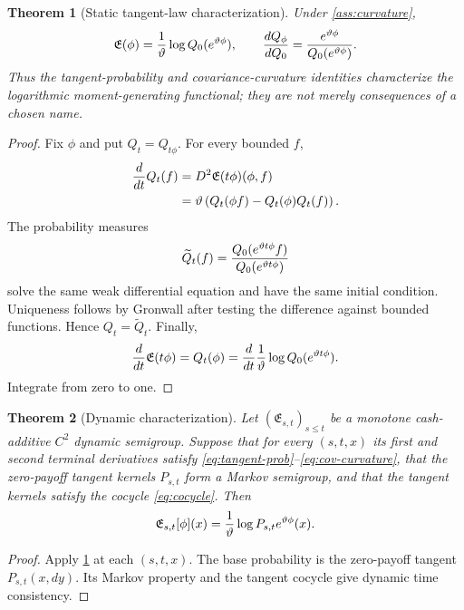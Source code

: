 \documentclass[11pt,reqno]{amsart}
\newtheorem{theorem}{Theorem}[section]
\theoremstyle{definition}
\theoremstyle{remark}
\begin{document}
\begin{theorem}[Static tangent-law characterization]\label{thm:characterization}
Under \cref{ass:curvature},
\begin{equation}\label{eq:characterization}
 \mathfrak E(\phi)
 ={1\over\vartheta}\log Q_0(e^{\vartheta\phi}),
 \qquad
 {dQ_\phi\over dQ_0}
 ={e^{\vartheta\phi}\over Q_0(e^{\vartheta\phi})}.
\end{equation}
Thus the tangent-probability and covariance-curvature identities characterize
the logarithmic moment-generating functional; they are not merely consequences
of a chosen name.
\end{theorem}

\begin{proof}
Fix $\phi$ and put $Q_t=Q_{t\phi}$.  For every bounded $f$,
\begin{align*}
 {d\over dt}Q_t(f)
 &=D^2\mathfrak E(t\phi)(\phi,f)\\
 &=\vartheta\left(Q_t(\phi f)-Q_t(\phi)Q_t(f)\right).
\end{align*}
The probability measures
\[
 \widetilde Q_t(f)=
 {Q_0(e^{\vartheta t\phi}f)
  \over Q_0(e^{\vartheta t\phi})}
\]
solve the same weak differential equation and have the same initial condition.
Uniqueness follows by Gronwall after testing the difference against bounded
functions.  Hence $Q_t=\widetilde Q_t$.  Finally,
\[
 {d\over dt}\mathfrak E(t\phi)=Q_t(\phi)
 ={d\over dt}{1\over\vartheta}
 \log Q_0(e^{\vartheta t\phi}).
\]
Integrate from zero to one.
\end{proof}

\begin{theorem}[Dynamic characterization]\label{thm:dynamic-characterization}
Let $(\mathfrak E_{s,t})_{s\le t}$ be a monotone cash-additive $C^2$ dynamic
semigroup.  Suppose that for every $(s,t,x)$ its first and second terminal
derivatives satisfy \eqref{eq:tangent-prob}--\eqref{eq:cov-curvature}, that
the zero-payoff tangent kernels $P_{s,t}$ form a Markov semigroup, and that the
tangent kernels satisfy the cocycle \eqref{eq:cocycle}.  Then
\[
 \mathfrak E_{s,t}[\phi](x)
 ={1\over\vartheta}\log P_{s,t}e^{\vartheta\phi}(x).
\]
\end{theorem}

\begin{proof}
Apply \cref{thm:characterization} at each $(s,t,x)$.  The base probability is
the zero-payoff tangent $P_{s,t}(x,dy)$.  Its Markov property and the tangent
cocycle give dynamic time consistency.
\end{proof}
\end{document}
